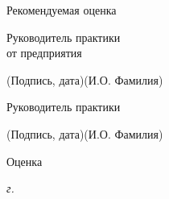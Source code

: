 \documentclass[14pt, russian]{scrartcl}
\begin{document}
\begin{titlepage}
\bigskip

\noindent Рекомендуемая оценка\hfill\underline{\hspace{195pt}}\hfill

\bigskip

\noindent \parbox{0.333\textwidth}{Руководитель практики\\от предприятия}  
\hfill \underline{\hspace{4cm}}\quad \underline{\hspace{4cm}}

\vspace{-2ex}
\noindent\hspace{13.5ex}\normalsize\hspace{170pt}\hspace{2ex}\scriptsize{(Подпись, дата)}\normalsize\hspace{30pt}\hspace{6ex}\scriptsize{(И.О. Фамилия)}\normalsize


\bigskip

\noindent Руководитель практики  \hfill \underline{\hspace{4cm}}\quad
\underline{\hspace{4cm}}

\vspace{-2ex}
\noindent\hspace{13.5ex}\normalsize\hspace{170pt}\hspace{2ex}\scriptsize{(Подпись, дата)}\normalsize\hspace{30pt}\hspace{6ex}\scriptsize{(И.О. Фамилия)}\normalsize

\vspace{2ex}
\noindent Оценка\hfill\underline{\hspace{195pt}}

\vfill

 


\begin{center}
\textsl{\the\year{} г.}
\end{center}
\end{titlepage}

\setlength{\tabcolsep}{3pt}
\newpage
\setcounter{page}{2}
\renewcommand\contentsname{\hfill{\normalfont{СОДЕРЖАНИЕ}}\hfill}  %
\tableofcontents
\newpage
\end{document}
